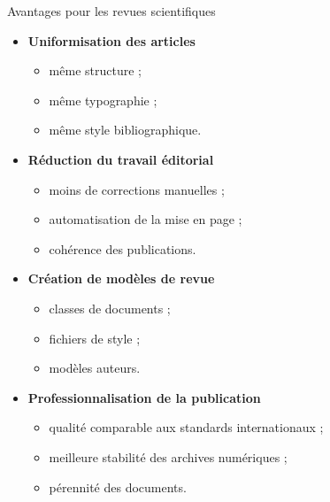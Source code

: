 \documentclass[aspectratio=169]{beamer}
\begin{document}
	
	\begin{frame}{Avantages pour les revues scientifiques}
		\begin{itemize}
			\item \textbf{Uniformisation des articles}
			\begin{itemize}
				\item même structure ;
				\item même typographie ;
				\item même style bibliographique.
			\end{itemize}
			
			\vspace{0.3cm}
			
			\item \textbf{Réduction du travail éditorial}
			\begin{itemize}
				\item moins de corrections manuelles ;
				\item automatisation de la mise en page ;
				\item cohérence des publications.
			\end{itemize}
			
			\vspace{0.3cm}
			
			\item \textbf{Création de modèles de revue}
			\begin{itemize}
				\item classes de documents ;
				\item fichiers de style ;
				\item modèles auteurs.
			\end{itemize}
			
			\vspace{0.3cm}
			
			\item \textbf{Professionnalisation de la publication}
			\begin{itemize}
				\item qualité comparable aux standards internationaux ;
				\item meilleure stabilité des archives numériques ;
				\item pérennité des documents.
			\end{itemize}
		\end{itemize}
	\end{frame}
	
\end{document}
